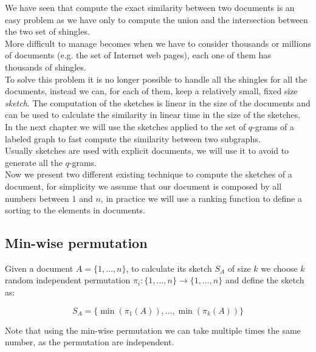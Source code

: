 We have seen that compute the exact similarity between two documents is an easy problem
as we have only to compute the union and the intersection between the two set of shingles.\\

More difficult to manage becomes when we have to consider thousands or millions of documents
(e.g. the set of Internet web pages), each one of them has thousands of shingles.\\

To solve this problem it is no longer possible to handle all the shingles for all the documents, 
instead we can, for each of them, keep a relatively small, fixed size \textit{sketch}.
The computation of the sketches is linear in the size of the documents and can be used to calculate
the similarity in linear time in the size of the sketches.\\

In the next chapter we will use the sketches applied to the set of $q$-grams of a labeled graph to 
fast compute the similarity between two subgraphs.\\

Usually sketches are used with explicit documents, we will use it to avoid to generate all the $q$-grams.\\

Now we present two different existing technique to compute the sketches of a document, 
for simplicity we assume that our document is composed by all numbers between $1$ and $n$, 
in practice we will use a ranking function to define a sorting to the elements in documents.

\subsection*{Min-wise permutation}

Given a document $A = \{1, \ldots, n\}$, to calculate its sketch $S_{A}$ of size $k$ 
we choose $k$ random independent permutation $\pi_{i} : \{1, \ldots, n\} \rightarrow \{1, \ldots, n\}$ and define the sketch as:

\begin{equation*}
	S_{A} = \{ \min(\pi_{1}(A)), \ldots, \min(\pi_{k}(A)) \}
\end{equation*}

Note that using the min-wise permutation we can take multiple times the same number, as the permutation are independent.

